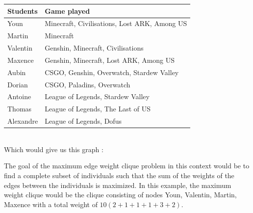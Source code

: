 \documentclass{article}
\begin{document}
    \begin{tabular}{|p{10em}|p{35em}|}
        \hline
        \textbf{Students} & \textbf{Game played} \\
        \hline
        Youn & Minecraft, Civilisations, Lost ARK, Among US \\
        \hline
        Martin & Minecraft \\
        \hline
        Valentin & Genshin, Minecraft, Civilisations \\
        \hline
        Maxence & Genshin, Minecraft, Lost ARK, Among US \\
        \hline
        Aubin & CSGO, Genshin, Overwatch, Stardew Valley\\
        \hline
        Dorian & CSGO, Paladins, Overwatch \\
        \hline
        Antoine & League of Legends, Stardew Valley \\
        \hline
        Thomas & League of Legends, The Last of US \\
        \hline
        Alexandre & League of Legends, Dofus \\
        \hline
    \end{tabular}
    \vspace{1\baselineskip} \\
    Which would give us this graph :

    \begin{center}
    \end{center}
    
    The goal of the maximum edge weight clique problem in this context would be to find a complete subset of individuals such that the sum of the weights of the edges between the individuals is maximized. In this example, the maximum weight clique would be the clique consisting of nodes Youn, Valentin, Martin, Maxence with a total weight of $10(2+1+1+1+3+2)$.

\end{document}
